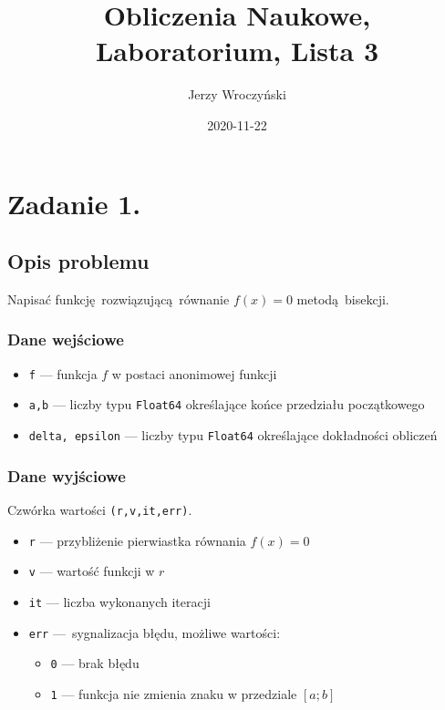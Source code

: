 \documentclass[10pt]{article}
\title{Obliczenia Naukowe,\\Laboratorium, Lista 3}
\author{Jerzy Wroczyński}
\date{2020-11-22}
\begin{document}
\maketitle

\section{Zadanie 1.}

\subsection{Opis problemu}

Napisać funkcję rozwiązującą równanie $f(x) = 0$ metodą bisekcji.

\subsubsection{Dane wejściowe}

\begin{itemize}
    \item \texttt{f} — funkcja $f$ w postaci anonimowej funkcji
    \item \texttt{a,b} — liczby typu \texttt{Float64} określające końce przedziału początkowego
    \item \texttt{delta, epsilon} — liczby typu \texttt{Float64} określające dokładności obliczeń
\end{itemize}

\subsubsection{Dane wyjściowe}

Czwórka wartości \texttt{(r,v,it,err)}.

\begin{itemize}
    \item \texttt{r} — przybliżenie pierwiastka równania $f(x) = 0$
    \item \texttt{v} — wartość funkcji w $r$
    \item \texttt{it} — liczba wykonanych iteracji
    \item \texttt{err} — sygnalizacja błędu, możliwe wartości:
    \begin{itemize}
        \item \texttt{0} — brak błędu
        \item \texttt{1} — funkcja nie zmienia znaku w przedziale $[a;b]$
    \end{itemize}
\end{itemize}
\end{document}
